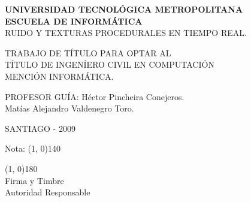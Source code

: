\documentclass[a4paper,12pt,openany,oneside]{book}
\begin{document}
\frontmatter

\thispagestyle{empty}

\begin{center}
\textbf{UNIVERSIDAD TECNOLÓGICA METROPOLITANA\\
ESCUELA DE INFORMÁTICA\\}
\vspace{2cm}
RUIDO Y TEXTURAS PROCEDURALES EN TIEMPO REAL.\\
\vspace{2cm}
\end{center}

\begin{flushright}
\parbox[r]{8cm}{TRABAJO DE TÍTULO PARA OPTAR AL\\ TÍTULO DE INGENÍERO CIVIL EN COMPUTACIÓN\\ MENCIÓN INFORMÁTICA.}
\end{flushright}
\vspace{2cm}
\begin{flushright}
PROFESOR GUÍA: Héctor Pincheira Conejeros.\\
\vspace{1cm}
Matías Alejandro Valdenegro Toro.
\end{flushright}
\vspace{6cm}
\begin{center}
SANTIAGO - 2009
\end{center}

\newpage

\begin{flushright}

\vspace*{20 mm}

Nota: \line(1, 0){140} \\

\vspace*{30 mm}

\line(1, 0){180}\\
Firma y Timbre\\
Autoridad Responsable
\end{flushright}


\end{document}
